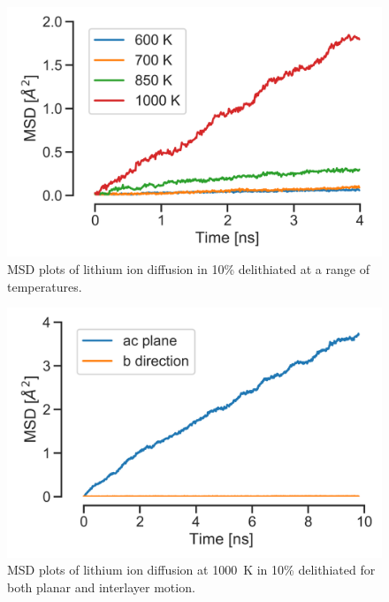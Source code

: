 \begin{figure}[p]
\centering
\includegraphics[width=0.8\linewidth]{figures/static/MSD_all}
\caption{MSD plots of lithium ion diffusion in 10\% delithiated  at a range of temperatures.}
\label{fig:msdall}
\end{figure}

\begin{figure}[p]
\centering
\includegraphics[width=0.8\linewidth]{figures/static/MSD_1000}
\caption{MSD plots of lithium ion diffusion at \SI{1000}{\kelvin} in 10\% delithiated  for both planar and interlayer motion.}
\label{fig:msd1000}
\end{figure}

